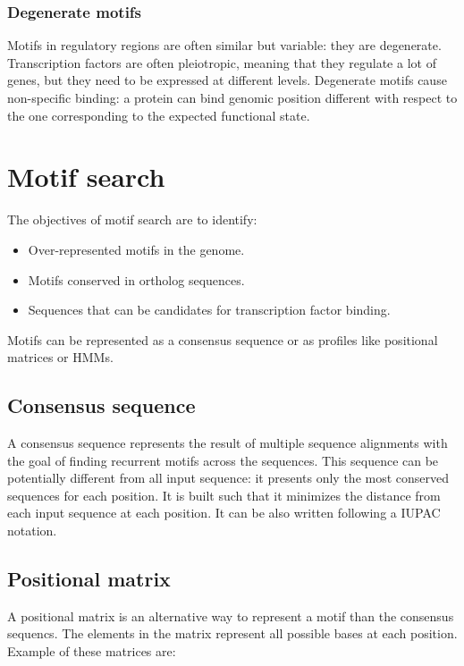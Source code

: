 	\subsubsection{Degenerate motifs}
	Motifs in regulatory regions are often similar but variable: they are degenerate.
	Transcription factors are often pleiotropic, meaning that they regulate a lot of genes, but they need to be expressed at different levels.
	Degenerate motifs cause non-specific binding: a protein can bind genomic position different with respect to the one corresponding to the expected functional state.

\section{Motif search}
The objectives of motif search are to identify:

\begin{multicols}{3}
	\begin{itemize}
		\item Over-represented motifs in the genome.
		\item Motifs conserved in ortholog sequences.
		\item Sequences that can be candidates for transcription factor binding.
	\end{itemize}
\end{multicols}

Motifs can be represented as a consensus sequence or as profiles like positional matrices or HMMs.

	\subsection{Consensus sequence}
	A consensus sequence represents the result of multiple sequence alignments with the goal of finding recurrent motifs across the sequences.
	This sequence can be potentially different from all input sequence: it presents only the most conserved sequences for each position.
	It is built such that it minimizes the distance from each input sequence at each position.
	It can be also written following a IUPAC notation.

	\subsection{Positional matrix}
	A positional matrix is an alternative way to represent a motif than the consensus sequencs.
	The elements in the matrix represent all possible bases at each position.
	Example of these matrices are:

